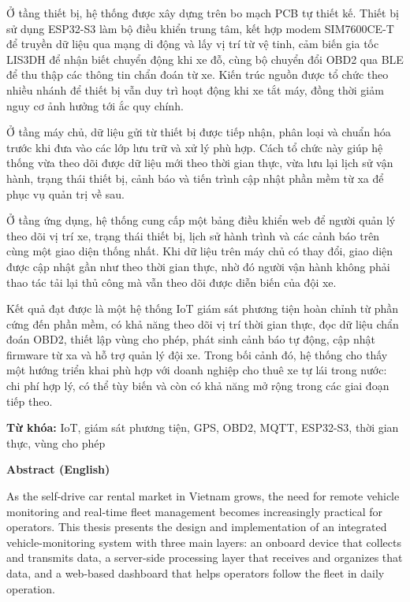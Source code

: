 \documentclass[a4paper]{extarticle}
\begin{document}
Ở tầng thiết bị, hệ thống được xây dựng trên bo mạch PCB tự thiết kế.
Thiết bị sử dụng ESP32-S3 làm bộ điều khiển trung tâm, kết hợp modem
SIM7600CE-T để truyền dữ liệu qua mạng di động và lấy vị trí từ vệ tinh,
cảm biến gia tốc LIS3DH để nhận biết chuyển động khi xe đỗ, cùng bộ
chuyển đổi OBD2 qua BLE để thu thập các thông tin chẩn đoán từ xe. Kiến
trúc nguồn được tổ chức theo nhiều nhánh để thiết bị vẫn duy trì hoạt
động khi xe tắt máy, đồng thời giảm nguy cơ ảnh hưởng tới ắc quy chính.

Ở tầng máy chủ, dữ liệu gửi từ thiết bị được tiếp nhận, phân loại và
chuẩn hóa trước khi đưa vào các lớp lưu trữ và xử lý phù hợp. Cách tổ
chức này giúp hệ thống vừa theo dõi được dữ liệu mới theo thời gian thực,
vừa lưu lại lịch sử vận hành, trạng thái thiết bị, cảnh báo và tiến
trình cập nhật phần mềm từ xa để phục vụ quản trị về sau.

Ở tầng ứng dụng, hệ thống cung cấp một bảng điều khiển web để người quản
lý theo dõi vị trí xe, trạng thái thiết bị, lịch sử hành trình và các
cảnh báo trên cùng một giao diện thống nhất. Khi dữ liệu trên máy chủ có
thay đổi, giao diện được cập nhật gần như theo thời gian thực, nhờ đó
người vận hành không phải thao tác tải lại thủ công mà vẫn theo dõi được
diễn biến của đội xe.

Kết quả đạt được là một hệ thống IoT giám sát phương tiện hoàn chỉnh từ
phần cứng đến phần mềm, có khả năng theo dõi vị trí thời gian thực, đọc
dữ liệu chẩn đoán OBD2, thiết lập vùng cho phép, phát sinh cảnh báo tự
động, cập nhật firmware từ xa và hỗ trợ quản lý đội xe. Trong bối cảnh
đó, hệ thống cho thấy một hướng triển khai phù hợp với doanh nghiệp cho
thuê xe tự lái trong nước: chi phí hợp lý, có thể tùy biến và còn có khả năng mở rộng trong các giai đoạn tiếp theo.

\textbf{Từ khóa:} IoT, giám sát phương tiện, GPS, OBD2, MQTT, ESP32-S3, thời
gian thực, vùng cho phép

\textbf{Abstract (English)}

As the self-drive car rental market in Vietnam grows, the need for
remote vehicle monitoring and real-time fleet management becomes
increasingly practical for operators. This thesis presents the design
and implementation of an integrated vehicle-monitoring system with three
main layers: an onboard device that collects and transmits data, a
server-side processing layer that receives and organizes that data, and
a web-based dashboard that helps operators follow the fleet in daily
operation.
\end{document}
